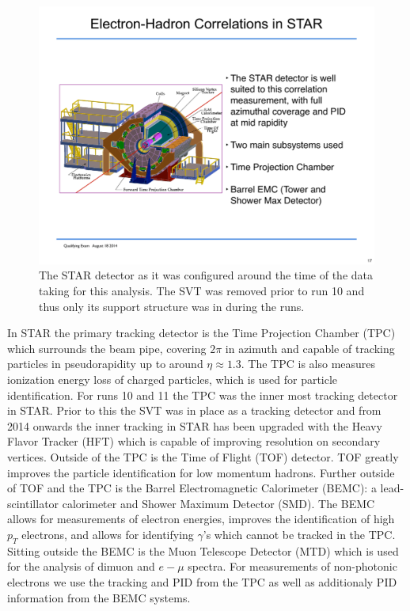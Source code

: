 \begin{figure}[htbp]
\begin{center}
\includegraphics[scale=0.7]{Plots/Detector/STAR_Detector.pdf}
\end{center}
\caption[STAR Detector]{The STAR detector as it was configured around the time of the data taking for this analysis. The SVT was removed prior to run 10 and thus only its support structure was in during the runs.}
\label{fig:STAR}
\end{figure}

In STAR the primary tracking detector is the Time Projection Chamber (TPC) which surrounds the beam pipe, covering $2\pi$ in azimuth and capable of tracking particles in pseudorapidity up to around $\eta \approx 1.3$. The TPC is also measures ionization energy loss of charged particles, which is used for particle identification. For runs 10 and 11 the TPC was the inner most tracking detector in STAR. Prior to this the SVT was in place as a tracking detector and from 2014 onwards the inner tracking in STAR has been upgraded with the Heavy Flavor Tracker (HFT) which is capable of improving resolution on secondary vertices. Outside of the TPC is the Time of Flight (TOF) detector. TOF greatly improves the particle identification for low momentum hadrons. Further outside of TOF and the TPC is the Barrel Electromagnetic Calorimeter (BEMC): a lead-scintillator calorimeter and Shower Maximum Detector (SMD). The BEMC allows for measurements of electron energies, improves the identification of high $p_T$ electrons, and allows for identifying $\gamma$'s which cannot be tracked in the TPC. Sitting outside the BEMC is the Muon Telescope Detector (MTD) which is used for the analysis of dimuon and $e-\mu$ spectra. For measurements of non-photonic electrons we use the tracking and PID from the TPC as well as additionaly PID information from the BEMC systems.

